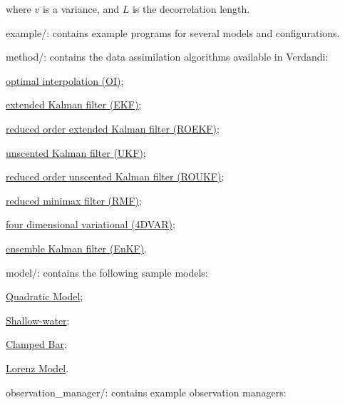 \documentclass{tufte-book}
\begin{document}
\begin{DoxyItemize}
\begin{itemize}
      where $v$ is a variance, and $L$ is the decorrelation length.
	\end{itemize}
\item {\ttfamily example/}\-: contains example programs for several models and configurations. 
\item {\ttfamily method/}\-: contains the data assimilation algorithms available in Verdandi: 
\begin{DoxyItemize}
\item \hyperlink{optimal_interpolation}{optimal interpolation (\-O\-I)};
\item \hyperlink{extended_kalman_filter}{extended \-Kalman filter (\-E\-K\-F)};
\item \hyperlink{reduced_order_extended_kalman_filter}{reduced order extended \-Kalman filter (\-R\-O\-E\-K\-F)};
\item \hyperlink{unscented_kalman_filter}{unscented \-Kalman filter (\-U\-K\-F)};
\item \hyperlink{reduced_order_unscented_kalman_filter}{reduced order unscented \-Kalman filter (\-R\-O\-U\-K\-F)};
\item \hyperlink{reduced_minimax_filter}{reduced minimax filter (\-R\-M\-F)};
\item \hyperlink{four_dimensional_variational}{four dimensional variational (4\-D\-V\-A\-R)};
\item \hyperlink{ensemble_kalman_filter}{ensemble \-Kalman filter (\-En\-K\-F)}.
\end{DoxyItemize}
\item {\ttfamily model/}\-: contains the following sample models:
\begin{DoxyItemize}
\item \hyperlink{quadratic_model}{\-Quadratic \-Model};
\item \hyperlink{shallow_water_model}{\-Shallow-\/water};
\item \hyperlink{clamped_bar_model}{\-Clamped \-Bar};
\item \hyperlink{lorenz_model}{\-Lorenz \-Model}.
\end{DoxyItemize}
\item {\ttfamily observation\-\_\-manager/}\-: contains example observation managers:

\end{DoxyItemize}
\end{document}
